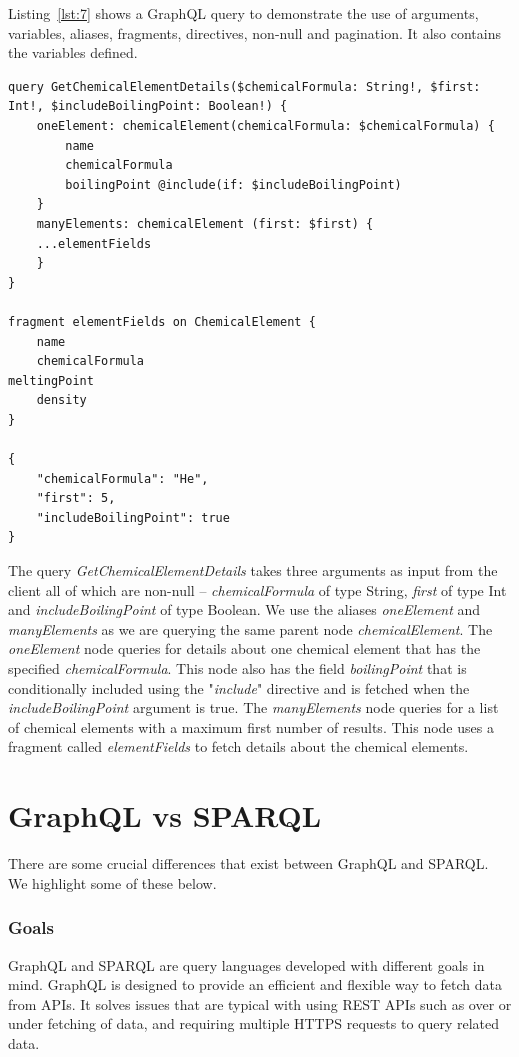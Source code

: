 Listing~\ref{lst:7} shows a GraphQL query to demonstrate the use of arguments, variables, aliases, fragments, directives, non-null and pagination. It also contains the variables defined.

\begin{minipage}{\linewidth}
\begin{lstlisting}[label=lst:7, caption={GraphQL Query demonstrating some useful features}]
query GetChemicalElementDetails($chemicalFormula: String!, $first: Int!, $includeBoilingPoint: Boolean!) {
	oneElement: chemicalElement(chemicalFormula: $chemicalFormula) {
		name
		chemicalFormula
		boilingPoint @include(if: $includeBoilingPoint) 
	}
	manyElements: chemicalElement (first: $first) {
	...elementFields
	}
}

fragment elementFields on ChemicalElement {
	name
	chemicalFormula
meltingPoint
	density
}

{
	"chemicalFormula": "He",
	"first": 5, 
	"includeBoilingPoint": true
}
\end{lstlisting}
\end{minipage}

The query \textit{GetChemicalElementDetails} takes three arguments as input from the client all of which are non-null – \textit{chemicalFormula} of type String, \textit{first} of type Int and \textit{includeBoilingPoint} of type Boolean. We use the aliases \textit{oneElement} and \textit{manyElements} as we are querying the same parent node \textit{chemicalElement}. The \textit{oneElement} node queries for details about one chemical element that has the specified \textit{chemicalFormula}. This node also has the field \textit{boilingPoint} that is conditionally included using the "\textit{include}" directive and is fetched when the \textit{includeBoilingPoint} argument is true. The \textit{manyElements} node queries for a list of chemical elements with a maximum first number of results. This node uses a fragment called \textit{elementFields} to fetch details about the chemical elements.


\section{GraphQL vs SPARQL}
There are some crucial differences that exist between GraphQL and SPARQL. We highlight some of these below.

\subsubsection*{Goals}
GraphQL and SPARQL are query languages developed with different goals in mind. GraphQL is designed to provide an efficient and flexible way to fetch data from APIs. It solves issues that are typical with using REST APIs such as over or under fetching of data, and requiring multiple HTTPS requests to query related data. 

